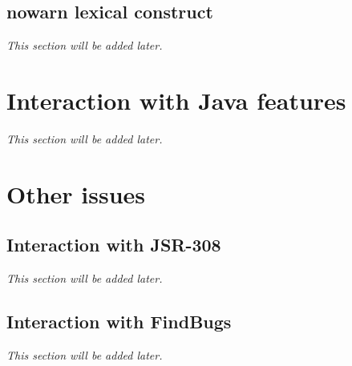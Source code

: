 \subsection{nowarn lexical construct}

\textit{This section will be added later.} %


\section{Interaction with Java features}

\textit{This section will be added later.} %


\section{Other issues}

\subsection{Interaction with JSR-308}
\textit{This section will be added later.} %

\subsection{Interaction with FindBugs}

\textit{This section will be added later.} %

